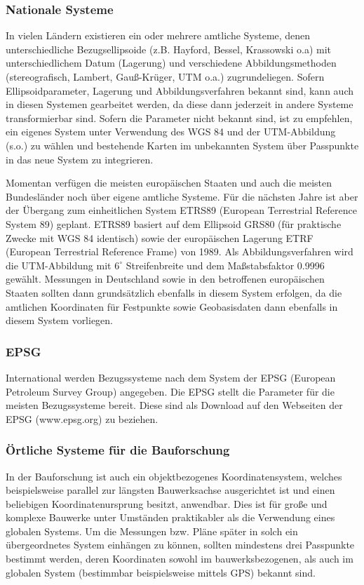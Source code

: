 \subsubsection*{Nationale Systeme}
In vielen Ländern existieren ein oder mehrere amtliche Systeme, denen unterschiedliche Bezugsellipsoide (z.B. Hayford, Bessel, Krassowski o.a) mit unterschiedlichem Datum (Lagerung) und verschiedene Abbildungsmethoden (stereografisch, Lambert, Gauß-Krüger, UTM o.a.) zugrundeliegen. Sofern Ellipsoidparameter, Lagerung und Abbildungsverfahren bekannt sind, kann auch in diesen Systemen gearbeitet werden, da diese dann jederzeit in andere Systeme transformierbar sind. Sofern die Parameter nicht bekannt sind, ist zu empfehlen, ein eigenes System unter Verwendung des WGS 84 und der UTM-Abbildung (s.o.) zu wählen und bestehende Karten im unbekannten System über Passpunkte in das neue System zu integrieren.

Momentan verfügen die meisten europäischen Staaten und auch die meisten Bundesländer noch über eigene amtliche Systeme. Für die nächsten Jahre ist aber der Übergang zum einheitlichen System ETRS89 (European Terrestrial Reference System 89) geplant. ETRS89 basiert auf dem Ellipsoid GRS80 (für praktische Zwecke mit WGS 84 identisch) sowie der europäischen Lagerung ETRF (European Terrestrial Reference Frame) von 1989. Als Abbildungsverfahren wird die UTM-Abbildung mit $6^{\circ}$ Streifenbreite und dem Maßstabsfaktor 0.9996 gewählt. Messungen in Deutschland sowie in den betroffenen europäischen Staaten sollten dann grundsätzlich ebenfalls in diesem System erfolgen, da die amtlichen Koordinaten für Festpunkte sowie Geobasisdaten dann ebenfalls in diesem System vorliegen.

\subsubsection*{EPSG}
International werden Bezugssysteme nach dem System der EPSG (European Petroleum Survey Group) angegeben. Die EPSG stellt die Parameter für die meisten Bezugssysteme bereit. Diese sind als Download auf den Webseiten der EPSG (www.epsg.org) zu beziehen.

\subsubsection*{Örtliche Systeme für die Bauforschung}
In der Bauforschung ist auch ein objektbezogenes Koordinatensystem, welches beispielsweise parallel zur längsten Bauwerksachse ausgerichtet ist und einen beliebigen Koordinatenursprung besitzt, anwendbar. Dies ist für große und komplexe Bauwerke unter Umständen praktikabler als die Verwendung eines globalen Systems. Um die Messungen bzw. Pläne später in solch ein übergeordnetes System einhängen zu können, sollten mindestens drei Passpunkte bestimmt werden, deren Koordinaten sowohl im bauwerksbezogenen, als auch im globalen System (bestimmbar beispielsweise mittels GPS) bekannt sind.

